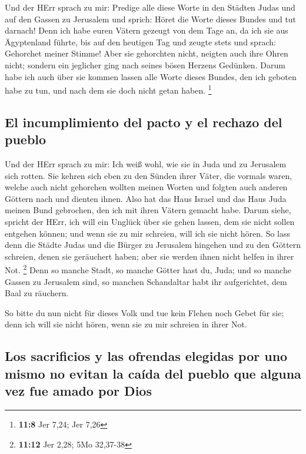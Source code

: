  Und der HErr sprach zu mir: Predige alle diese Worte in
den Städten Judas und auf den Gassen zu Jerusalem und sprich: Höret die
Worte dieses Bundes und tut darnach!  Denn ich habe euren
Vätern gezeugt von dem Tage an, da ich sie aus Ägyptenland führte, bis
auf den heutigen Tag und zeugte stets und sprach: Gehorchet meiner
Stimme!  Aber sie gehorchten nicht, neigten auch ihre
Ohren nicht; sondern ein jeglicher ging nach seines bösen Herzens
Gedünken. Darum habe ich auch über sie kommen lassen alle Worte dieses
Bundes, den ich geboten habe zu tun, und nach dem sie doch nicht getan
haben. \footnote{\textbf{11:8} Jer 7,24; Jer 7,26}

\hypertarget{el-incumplimiento-del-pacto-y-el-rechazo-del-pueblo}{%
\subsection{El incumplimiento del pacto y el rechazo del
pueblo}\label{el-incumplimiento-del-pacto-y-el-rechazo-del-pueblo}}

 Und der HErr sprach zu mir: Ich weiß wohl, wie sie in
Juda und zu Jerusalem sich rotten.  Sie kehren sich eben
zu den Sünden ihrer Väter, die vormals waren, welche auch nicht
gehorchen wollten meinen Worten und folgten auch anderen Göttern nach
und dienten ihnen. Also hat das Haus Israel und das Haus Juda meinen
Bund gebrochen, den ich mit ihren Vätern gemacht habe. 
Darum siehe, spricht der HErr, ich will ein Unglück über sie gehen
lassen, dem sie nicht sollen entgehen können; und wenn sie zu mir
schreien, will ich sie nicht hören.  So lass denn die
Städte Judas und die Bürger zu Jerusalem hingehen und zu den Göttern
schreien, denen sie geräuchert haben; aber sie werden ihnen nicht helfen
in ihrer Not. \footnote{\textbf{11:12} Jer 2,28; 5Mo 32,37-38}
 Denn so manche Stadt, so manche Götter hast du, Juda;
und so manche Gassen zu Jerusalem sind, so manchen Schandaltar habt ihr
aufgerichtet, dem Baal zu räuchern.

 So bitte du nun nicht für dieses Volk und tue kein
Flehen noch Gebet für sie; denn ich will sie nicht hören, wenn sie zu
mir schreien in ihrer Not.

\hypertarget{los-sacrificios-y-las-ofrendas-elegidas-por-uno-mismo-no-evitan-la-cauxedda-del-pueblo-que-alguna-vez-fue-amado-por-dios}{%
\subsection{Los sacrificios y las ofrendas elegidas por uno mismo no
evitan la caída del pueblo que alguna vez fue amado por
Dios}\label{los-sacrificios-y-las-ofrendas-elegidas-por-uno-mismo-no-evitan-la-cauxedda-del-pueblo-que-alguna-vez-fue-amado-por-dios}}


